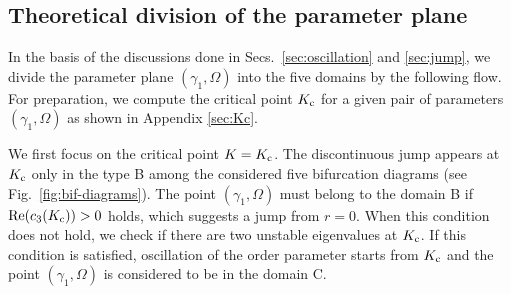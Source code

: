 




\subsection{Theoretical division of the parameter plane}
\label{sec:division}

In the basis of the discussions done in Secs.~\ref{sec:oscillation} and \ref{sec:jump},
we divide the parameter plane $(\gamma_{1},\Omega)$
into the five domains by the following flow.
For preparation, we compute the critical point $K_{\rm c}$
for a given pair of parameters $(\gamma_{1},\Omega)$
as shown in Appendix \ref{sec:Kc}.

We first focus on the critical point $K=K_{\rm c}$.
The discontinuous jump appears at $K_{\rm c}$ only in the type B
among the considered five bifurcation diagrams
(see Fig.~\ref{fig:bif-diagrams}).
The point $(\gamma_{1},\Omega)$ must belong to the domain B
if ${\rm Re}(c_{3}(K_{\rm c}))>0$ holds, which suggests a jump from $r=0$.
When this condition does not hold,
we check if there are two unstable eigenvalues at $K_{\rm c}$.
If this condition is satisfied, oscillation of the order parameter
starts from $K_{\rm c}$ and the point $(\gamma_{1},\Omega)$
is considered to be in the domain C.

